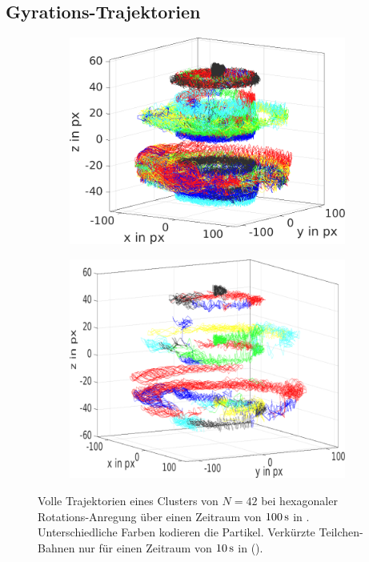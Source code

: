       \subsection{Gyrations-Trajektorien}\label{sub:gyrat}

          \begin{figure}[!t]
            \begin{subfigure}{0.49\textwidth}
              \centering
              \includegraphics[width=\textwidth,height=0.8\textwidth]{figs/auswertung/trajectoriesrot.png}
              \caption{}\label{img:volltraj}
            \end{subfigure}
            \begin{subfigure}{0.49\textwidth}
              \centering
              \includegraphics[width=\textwidth,height=0.8\textwidth]{figs/auswertung/trajectoriesrotkurz.png}
              \caption{}\label{img:kurztraj}
            \end{subfigure}
            \caption{Volle Trajektorien eines Clusters von $N=42$ bei hexagonaler Rotations-Anregung über einen Zeitraum von $\unit[100]{s}$ in . Unterschiedliche Farben kodieren die Partikel. Verkürzte Teilchen-Bahnen nur für einen Zeitraum von $\unit[10]{s}$ in ().}
          \end{figure}


